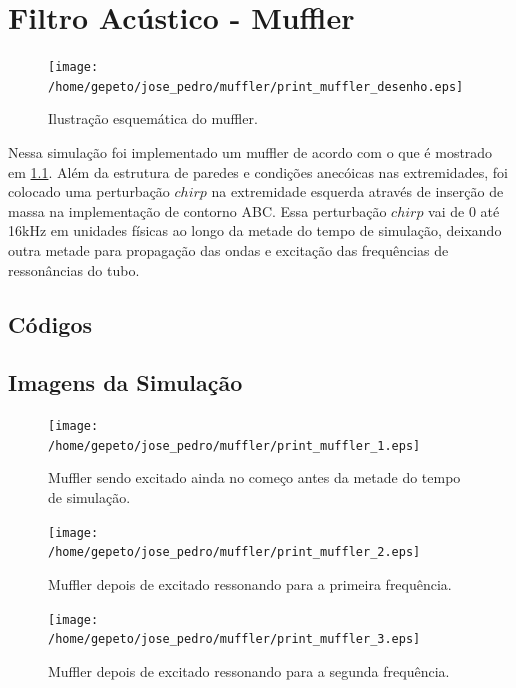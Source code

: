 \chapter{Filtro Acústico - Muffler}\label{parte_1}

\begin{figure}[h!]
    \centering
    \hspace{-2.5cm}
    \texttt{[image: /home/gepeto/jose\_pedro/muffler/print\_muffler\_desenho.eps]}
    \caption{Ilustração esquemática do muffler.}
    \label{fig13}
\end{figure}

Nessa simulação foi implementado um muffler de acordo com o que é mostrado em \ref{fig13}. Além da estrutura de paredes e condições anecóicas nas extremidades, foi colocado uma perturbação $chirp$ na extremidade esquerda através de inserção de massa na implementação de contorno ABC. Essa perturbação $chirp$ vai de 0 até 16kHz em unidades físicas ao longo da metade do tempo de simulação, deixando outra metade para propagação das ondas e excitação das frequências de ressonâncias do tubo.

\section{Códigos}


\newpage
\section{Imagens da Simulação}
\begin{figure}[h!]
    \centering
    \hspace{-1.5cm}
    \texttt{[image: /home/gepeto/jose\_pedro/muffler/print\_muffler\_1.eps]}
    \caption{Muffler sendo excitado ainda no começo antes da metade do tempo de simulação.}
    \label{fig14}
\end{figure}
\begin{figure}[h!]
    \centering
    \hspace{-1.5cm}
    \texttt{[image: /home/gepeto/jose\_pedro/muffler/print\_muffler\_2.eps]}
    \caption{Muffler depois de excitado ressonando para a primeira frequência.}
    \label{fig15}
\end{figure}
\begin{figure}[h!]
    \centering
    \hspace{-1.5cm}
    \texttt{[image: /home/gepeto/jose\_pedro/muffler/print\_muffler\_3.eps]}
    \caption{Muffler depois de excitado ressonando para a segunda frequência.}
    \label{fig16}
\end{figure}

